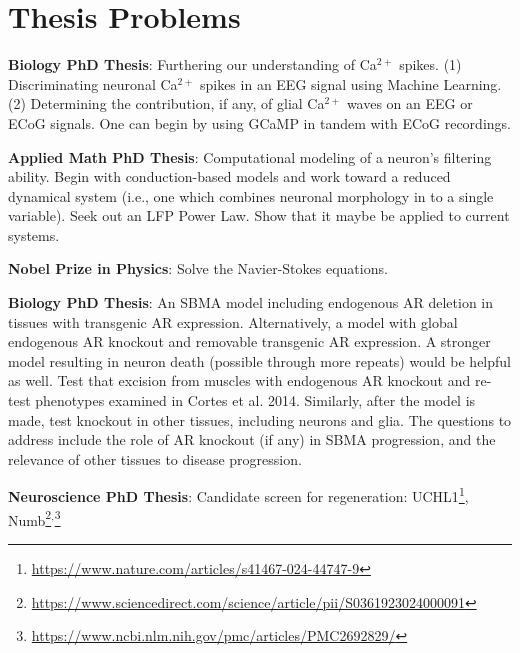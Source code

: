 \section{Thesis Problems}

\textbf{Biology PhD Thesis}: Furthering our understanding of Ca$^{2+}$ spikes. (1) Discriminating neuronal Ca$^{2+}$ spikes in an EEG signal using Machine Learning. (2) Determining the contribution, if any, of glial Ca$^{2+}$ waves on an EEG or ECoG signals. One can begin by using GCaMP in tandem with ECoG recordings. 

\textbf{Applied Math PhD Thesis}: Computational modeling of a neuron's filtering ability. Begin with conduction-based models and work toward a reduced dynamical system (i.e., one which combines neuronal morphology in to a single variable). Seek out an LFP Power Law. Show that it maybe be applied to current systems. 

\textbf{Nobel Prize in Physics}: Solve the Navier-Stokes equations.


\textbf{Biology PhD Thesis}: An SBMA model including endogenous AR deletion in tissues with transgenic AR expression. Alternatively, a model with global endogenous AR knockout and removable transgenic AR expression. A stronger model resulting in neuron death (possible through more repeats) would be helpful as well. Test that excision from muscles with endogenous AR knockout and re-test phenotypes examined in Cortes et al. 2014. Similarly, after the model is made, test knockout in other tissues, including neurons and glia. The questions to address include the role of AR knockout (if any) in SBMA progression, and the relevance of other tissues to disease progression.


\textbf{Neuroscience PhD Thesis}: Candidate screen for regeneration: UCHL1\footnote{\url{https://www.nature.com/articles/s41467-024-44747-9}}, Numb\footnote{\url{https://www.sciencedirect.com/science/article/pii/S0361923024000091}}$^,$\footnote{\url{https://www.ncbi.nlm.nih.gov/pmc/articles/PMC2692829/}}

\endinput